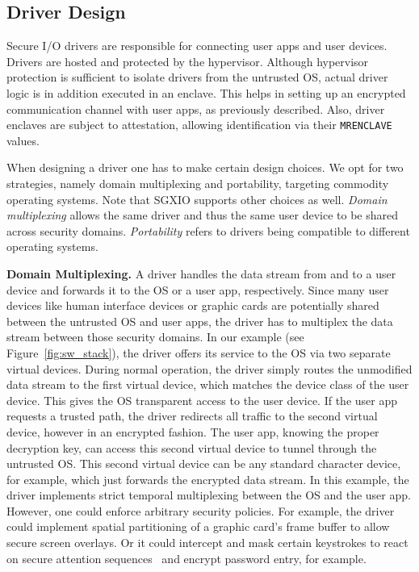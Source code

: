 \documentclass{sig-alternate-05-2015}
\begin{document}
\subsection{Driver Design}

Secure I/O drivers are responsible for connecting user apps and user devices.
Drivers are hosted and protected by the hypervisor. 
Although hypervisor protection is sufficient to isolate drivers from the untrusted OS, actual driver logic is in addition executed in an enclave. 
This helps in setting up an encrypted communication channel with user apps, as previously described. 
Also, driver enclaves are subject to attestation, allowing identification via their \verb!MRENCLAVE! values.

When designing a driver one has to make certain design choices. 
We opt for two strategies, namely domain multiplexing and portability, targeting commodity operating systems. 
Note that SGXIO supports other choices as well. 
\emph{Domain multiplexing} allows the same driver and thus the same user device to be shared across security domains. 
\emph{Portability} refers to drivers being compatible to different operating systems. 

\textbf{Domain Multiplexing.}
A driver handles the data stream from and to a user device and forwards it to the OS or a user app, respectively. 
Since many user devices like human interface devices or graphic cards are potentially shared between the untrusted OS and user apps, the driver has to multiplex the data stream between those security domains. 
In our example (see Figure~\ref{fig:sw_stack}), the driver offers its service to the OS via two separate virtual devices. 
During normal operation, the driver simply routes the unmodified data stream to the first virtual device, which matches the device class of the user device. 
This gives the OS transparent access to the user device. 
If the user app requests a trusted path, the driver redirects all traffic to the second virtual device, however in an encrypted fashion. 
The user app, knowing the proper decryption key, can access this second virtual device to tunnel through the untrusted OS. 
This second virtual device can be any standard character device, for example, which just forwards the encrypted data stream. 
In this example, the driver implements strict temporal multiplexing between the OS and the user app. 
However, one could enforce arbitrary security policies. 
For example, the driver could implement spatial partitioning of a graphic card's frame buffer to allow secure screen overlays. 
Or it could intercept and mask certain keystrokes to react on secure attention sequences~\cite{perrig_safe_2009} and encrypt password entry, for example.
 
\end{document}
